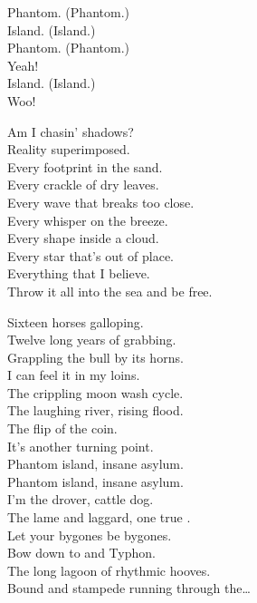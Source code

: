 
Phantom. (Phantom.) \\
Island. (Island.) \\
Phantom. (Phantom.) \\
Yeah! \\
Island. (Island.) \\
Woo! \\


Am I chasin' shadows? \\
Reality superimposed. \\
Every footprint in the sand. \\
Every crackle of dry leaves. \\
Every wave that breaks too close. \\
Every whisper on the breeze. \\
Every shape inside a cloud. \\
Every star that's out of place. \\
Everything that I believe. \\
Throw it all into the sea and be free. \\


Sixteen horses galloping. \\
Twelve long years of grabbing. \\
Grappling the bull by its horns. \\
I can feel it in my loins. \\
The crippling moon wash cycle. \\
The laughing river, rising flood. \\
The flip of the coin. \\
It's another turning point. \\

Phantom island, insane asylum. \\
Phantom island, insane asylum. \\
I'm the drover, cattle dog. \\
The lame and laggard, one true . \\

Let your bygones be bygones. \\
Bow down to  and Typhon. \\
The long lagoon of rhythmic hooves. \\
Bound and stampede running through the… \\

